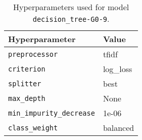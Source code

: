 \begin{table}[H]
\centering
\capstart
\begin{tabularx}{0.48\textwidth}{|X|l|}
\hline
Hyperparameter & Value \\
\hline
\texttt{preprocessor} & tfidf \\
\texttt{criterion} & log\_loss \\
\texttt{splitter} & best \\
\texttt{max\_depth} & None \\
\texttt{min\_impurity\_decrease} & 1e-06 \\
\texttt{class\_weight} & balanced \\
\hline
\end{tabularx}
\caption{Hyperparameters used for model \texttt{decision\_tree-G0-9}.}
\label{tab:hyperparameters_best_decision_tree}

\end{table}

